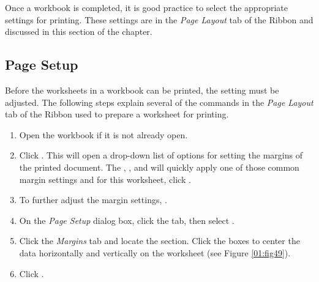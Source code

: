 Once a workbook is completed, it is good practice to select the appropriate settings for printing. These settings are in the \textit{Page Layout} tab of the Ribbon and discussed in this section of the chapter.

\subsection{Page Setup}

Before the worksheets in a workbook can be printed, the setting must be adjusted. The following steps explain several of the commands in the \textit{Page Layout} tab of the Ribbon used to prepare a worksheet for printing.

\begin{enumbox}
	\begin{enumerate}
		\item Open the  workbook if it is not already open.
		\item Click . This will open a drop-down list of options for setting the margins of the printed document. The , , and  will quickly apply one of those common margin settings and for this worksheet, click .
		\item To further adjust the margin settings, .
		\item On the \textit{Page Setup} dialog box, click the  tab, then select .
		\item Click the \textit{Margins} tab and locate the  section. Click the boxes to center the data horizontally and vertically on the worksheet (see Figure \ref{01:fig49}).
		\item Click .
	\end{enumerate}
\end{enumbox}

